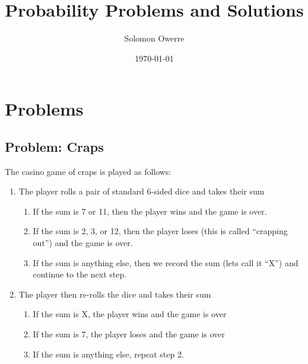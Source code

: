 \documentclass[aps,twocolumn,floatfix, nofootinbib, superscriptaddress]{revtex4-1}
\begin{document}
\date{\today}
\title{Probability Problems and Solutions}
\author{Solomon Owerre}



\maketitle

\section{Problems}

\subsection{Problem: Craps}
The casino game of craps is played as follows:
\begin{enumerate}
\item The player rolls a pair of standard 6-sided dice and takes their sum

\begin{enumerate}
\item If the sum is 7 or 11, then the player wins and the game is over.
\item If the sum is 2, 3, or 12, then the player loses (this is called “crapping out”) and
the game is over.
\item If the sum is anything else, then we record the sum (lets call it “X”) and continue
to the next step.
\end{enumerate}

\item The player then re-rolls the dice and takes their sum
\begin{enumerate}
\item  If the sum is X, the player wins and the game is over
\item  If the sum is 7, the player loses and the game is over
\item  If the sum is anything else, repeat step 2.
\end{enumerate}
\end{enumerate}
\end{document}
